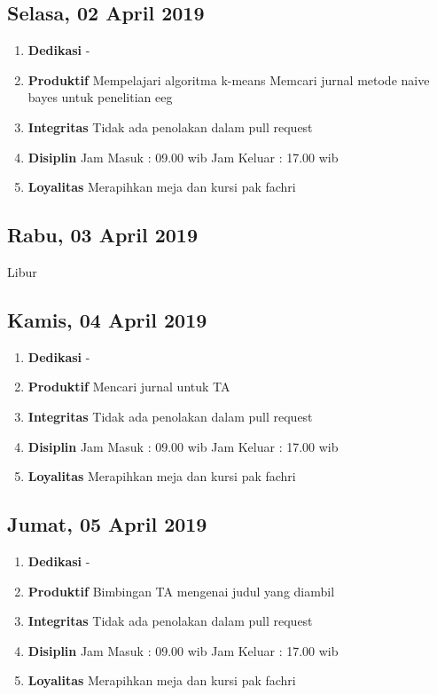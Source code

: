 \subsection{Selasa, 02 April 2019}
\begin{enumerate}
\item \textbf{Dedikasi}
\subitem -
\item \textbf{Produktif}
\subitem Mempelajari algoritma k-means 
\subitem Memcari jurnal metode naive bayes untuk penelitian eeg
\item \textbf{Integritas}
\subitem Tidak ada penolakan dalam pull request
\item \textbf{Disiplin}
\subitem Jam Masuk : 09.00 wib
\subitem Jam Keluar : 17.00 wib
\item \textbf{Loyalitas}
\subitem Merapihkan meja dan kursi pak fachri
\end{enumerate}

\subsection{Rabu, 03 April 2019}
Libur

\subsection{Kamis, 04 April 2019}
\begin{enumerate}
\item \textbf{Dedikasi}
\subitem -
\item \textbf{Produktif}
\subitem Mencari jurnal untuk TA 
\item \textbf{Integritas}
\subitem Tidak ada penolakan dalam pull request
\item \textbf{Disiplin}
\subitem Jam Masuk : 09.00 wib
\subitem Jam Keluar : 17.00 wib
\item \textbf{Loyalitas}
\subitem Merapihkan meja dan kursi pak fachri
\end{enumerate}

\subsection{Jumat, 05 April 2019}
\begin{enumerate}
\item \textbf{Dedikasi}
\subitem -
\item \textbf{Produktif}
\subitem Bimbingan TA mengenai judul yang diambil
\item \textbf{Integritas}
\subitem Tidak ada penolakan dalam pull request
\item \textbf{Disiplin}
\subitem Jam Masuk : 09.00 wib
\subitem Jam Keluar : 17.00 wib
\item \textbf{Loyalitas}
\subitem Merapihkan meja dan kursi pak fachri
\end{enumerate}